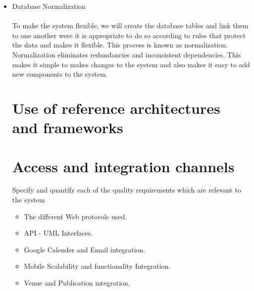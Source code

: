 \documentclass[a4paper]{article}
\begin{document}
\begin{itemize}
\\
\item Database Normalization \\\\
To make the system flexible, we will create the database tables and link them to one another were it is appropriate to do so according to rules that protect the data and makes it flexible. This process is known as normalization. Normalization eliminates redundancies and inconsistent dependencies. This makes it simple to makes changes to the system and also makes it easy to add new components to the system.
\\
\section{Use of reference architectures and frameworks}
\section{Access and integration channels}
 Specify and quantify each of the quality requirements which are relevant to the system

        \begin{itemize}
            \item The different Web protocols used.
            \item API - UML Interfaces.
            \item Google Calender and Email integration.
            \item Mobile Scalability and functionality Integration.
            \item Venue and Publication integration.
            \\
        \end{itemize}
        \end{itemize}
    
\end{document}
